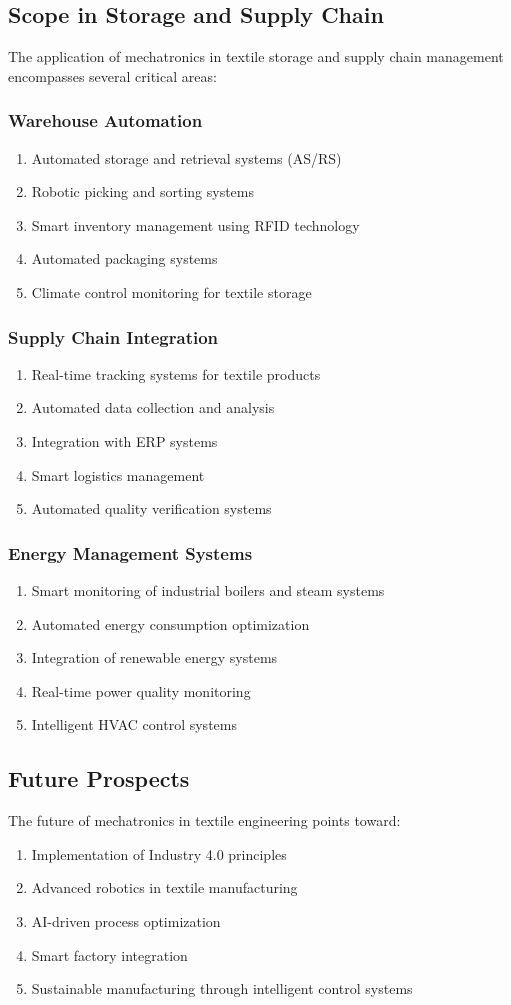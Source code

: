\subsection{Scope in Storage and Supply Chain}
The application of mechatronics in textile storage and supply chain management encompasses several critical areas:
\subsubsection{Warehouse Automation}
\begin{enumerate}
\item Automated storage and retrieval systems (AS/RS)
\item Robotic picking and sorting systems
\item Smart inventory management using RFID technology
\item Automated packaging systems
\item Climate control monitoring for textile storage
\end{enumerate}
\subsubsection{Supply Chain Integration}
\begin{enumerate}
\item Real-time tracking systems for textile products
\item Automated data collection and analysis
\item Integration with ERP systems
\item Smart logistics management
\item Automated quality verification systems
\end{enumerate}
\subsubsection{Energy Management Systems}
\begin{enumerate}
\item Smart monitoring of industrial boilers and steam systems
\item Automated energy consumption optimization
\item Integration of renewable energy systems
\item Real-time power quality monitoring
\item Intelligent HVAC control systems
\end{enumerate}
\subsection{Future Prospects}
The future of mechatronics in textile engineering points toward:
\begin{enumerate}
\item Implementation of Industry 4.0 principles
\item Advanced robotics in textile manufacturing
\item AI-driven process optimization
\item Smart factory integration
\item Sustainable manufacturing through intelligent control systems
\end{enumerate}

